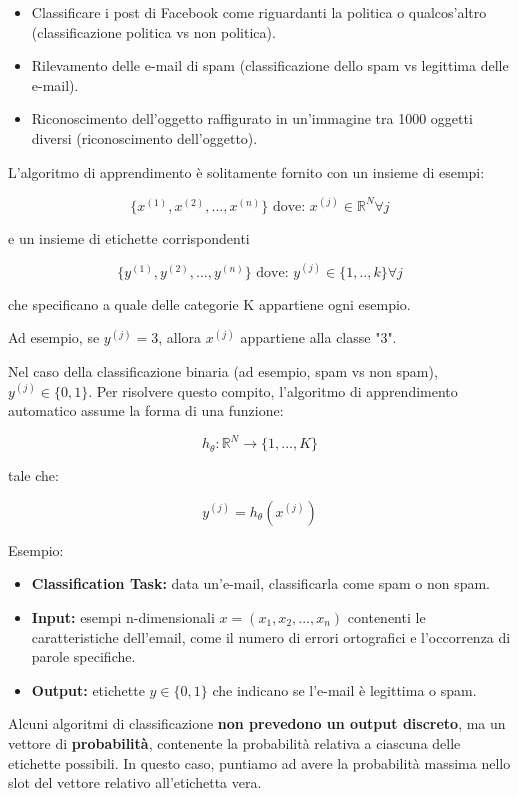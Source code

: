 \begin{itemize}
\item Classificare i post di Facebook come riguardanti la politica o qualcos'altro (classificazione politica vs non politica).
\item Rilevamento delle e-mail di spam (classificazione dello spam vs legittima delle e-mail).
\item Riconoscimento dell'oggetto raffigurato in un'immagine tra 1000 oggetti diversi (riconoscimento dell'oggetto).
\end{itemize}

\noindent
L'algoritmo di apprendimento è solitamente fornito con un insieme di esempi:

$$ \{x^{(1)}, x^{(2)}, ..., x^{(n)}\} \text{ dove: } x^{(j)} \in \mathbb{R}^{N} \forall j$$

\noindent
e un insieme di etichette corrispondenti

$$ \{y^{(1)}, y^{(2)}, ..., y^{(n)}\} \text{ dove: } y^{(j)} \in \{1,..,k\}\forall j$$

\noindent
che specificano a quale delle categorie K appartiene ogni esempio.

Ad esempio, se $y^{(j)} = 3$, allora $x^{(j)} $ appartiene alla classe "3".

Nel caso della classificazione binaria (ad esempio, spam vs non spam), $y^{(j)} \in \{0,1\} $. Per risolvere questo compito, l'algoritmo di apprendimento automatico assume la forma di una funzione:

$$ h_\theta: \mathbb{R}^{N} \rightarrow \{1, ... ,K\} $$

\noindent
tale che:

$$y^{(j)} = h_\theta(x^{(j)})$$

\noindent
Esempio:

\begin{itemize}
    \item \textbf{Classification Task:} data un'e-mail, classificarla come spam o non spam.
    \item \textbf{Input:} esempi n-dimensionali $ x = (x_1, x_2, ..., x_n)$ contenenti le caratteristiche dell'email, come il numero di errori ortografici e l'occorrenza di parole specifiche.
    \item \textbf{Output:} etichette $y \in \{0,1\}$ che indicano se l'e-mail è legittima o spam.
\end{itemize}

Alcuni algoritmi di classificazione \textbf{non prevedono un output discreto}, ma un vettore di \textbf{probabilità}, contenente la probabilità relativa a ciascuna delle etichette possibili. In questo caso, puntiamo ad avere la probabilità massima nello slot del vettore relativo all'etichetta vera. 

